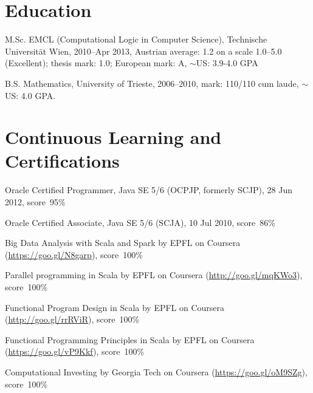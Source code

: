 \documentclass[letterpaper]{article}
\newenvironment{no-indent-itemize}{
  \begin{list}{}{
    \setlength{\leftmargin}{0em}
  }
}{
  \end{list}
}
\def\tilde{$\scriptstyle\sim$}
\begin{document}
\section*{Education}
\begin{no-indent-itemize}
  \item M.Sc. EMCL (Computational Logic in Computer Science), Technische Universit\"{a}t Wien, 2010--Apr 2013,
       Austrian average: 1.2 on a scale 1.0--5.0 (Excellent); thesis mark: 1.0; European mark: A, \tilde US: 3.9-4.0 GPA
  \item B.S. Mathematics, University of Trieste, 2006--2010, mark: 110/110 cum laude, \tilde US: 4.0 GPA.
\end{no-indent-itemize}

\section*{Continuous Learning and Certifications}
\begin{no-indent-itemize}
  \item Oracle Certified Programmer, Java SE 5/6 (OCPJP, formerly SCJP), 28 Jun 2012, score~95\%
  \item Oracle Certified Associate, Java SE 5/6 (SCJA), 10 Jul 2010, score~86\%
  \item Big Data Analysis with Scala and Spark by EPFL on Coursera 
        (\href{https://goo.gl/N8garp}{https://goo.gl/N8garp}), score~100\%
  \item Parallel programming in Scala by EPFL on Coursera 
        (\href{http://goo.gl/mqKWo3}{http://goo.gl/mqKWo3}), score~100\%
  \item Functional Program Design in Scala by EPFL on Coursera 
        (\href{https://goo.gl/vP9Kkf}{http://goo.gl/rrRViR}), score~100\%
  \item Functional Programming Principles in Scala by EPFL on Coursera 
        (\href{https://goo.gl/vP9Kkf}{https://goo.gl/vP9Kkf}), score~100\%
  \item Computational Investing by Georgia Tech on Coursera 
        (\href{https://goo.gl/oM9SZg}{https://goo.gl/oM9SZg}), score~100\%
\end{no-indent-itemize}
\end{document}
